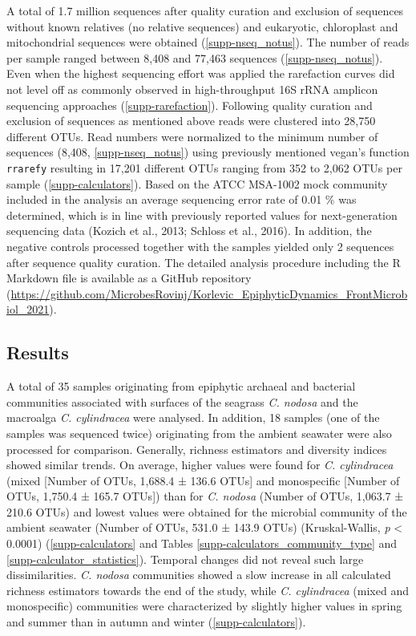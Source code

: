 \documentclass[
  12pt,
]{article}
\begin{document}
A total of 1.7 million sequences after quality curation and exclusion of
sequences without known relatives (no relative sequences) and
eukaryotic, chloroplast and mitochondrial sequences were obtained
(\autoref{supp-nseq_notus}). The number of reads per sample ranged
between 8,408 and 77,463 sequences (\autoref{supp-nseq_notus}). Even
when the highest sequencing effort was applied the rarefaction curves
did not level off as commonly observed in high-throughput 16S rRNA
amplicon sequencing approaches (\autoref{supp-rarefaction}). Following
quality curation and exclusion of sequences as mentioned above reads
were clustered into 28,750 different OTUs. Read numbers were normalized
to the minimum number of sequences (8,408, \autoref{supp-nseq_notus})
using previously mentioned vegan's function \texttt{rrarefy} resulting
in 17,201 different OTUs ranging from 352 to 2,062 OTUs per sample
(\autoref{supp-calculators}). Based on the ATCC MSA-1002 mock community
included in the analysis an average sequencing error rate of 0.01
\si{\percent} was determined, which is in line with previously reported
values for next-generation sequencing data (Kozich et al., 2013; Schloss
et al., 2016). In addition, the negative controls processed together
with the samples yielded only 2 sequences after sequence quality
curation. The detailed analysis procedure including the R Markdown file
is available as a GitHub repository
(\url{https://github.com/MicrobesRovinj/Korlevic_EpiphyticDynamics_FrontMicrobiol_2021}).

\hypertarget{results}{%
\subsection{Results}\label{results}}

A total of 35 samples originating from epiphytic archaeal and bacterial
communities associated with surfaces of the seagrass \emph{C. nodosa}
and the macroalga \emph{C. cylindracea} were analysed. In addition, 18
samples (one of the samples was sequenced twice) originating from the
ambient seawater were also processed for comparison. Generally, richness
estimators and diversity indices showed similar trends. On average,
higher values were found for \emph{C. cylindracea} (mixed {[}Number of
OTUs, 1,688.4 ± 136.6 OTUs{]} and monospecific {[}Number of OTUs,
1,750.4 ± 165.7 OTUs{]}) than for \emph{C. nodosa} (Number of OTUs,
1,063.7 ± 210.6 OTUs) and lowest values were obtained for the microbial
community of the ambient seawater (Number of OTUs, 531.0 ± 143.9 OTUs)
(Kruskal-Wallis, \emph{p} \textless{} 0.0001)
(\autoref{supp-calculators} and Tables
\ref{supp-calculators_community_type} and
\ref{supp-calculator_statistics}). Temporal changes did not reveal such
large dissimilarities. \emph{C. nodosa} communities showed a slow
increase in all calculated richness estimators towards the end of the
study, while \emph{C. cylindracea} (mixed and monospecific) communities
were characterized by slightly higher values in spring and summer than
in autumn and winter (\autoref{supp-calculators}).
\end{document}
